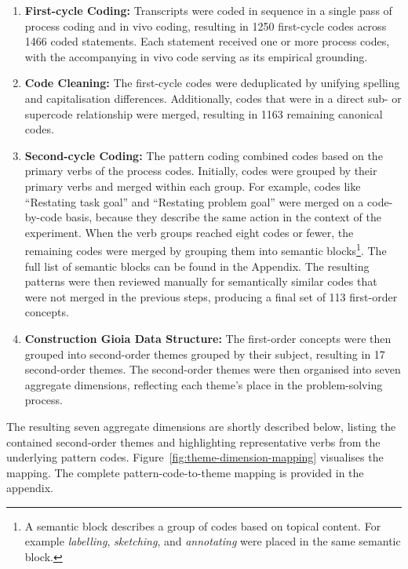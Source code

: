 \begin{enumerate}
    \item \textbf{First-cycle Coding:} Transcripts were coded in sequence in a single pass of process coding and in vivo coding, resulting in 1250 first-cycle codes across 1466 coded statements. Each statement received one or more process codes, with the accompanying in vivo code serving as its empirical grounding.

    \item \textbf{Code Cleaning:} The first-cycle codes were deduplicated by unifying spelling and capitalisation differences. Additionally, codes that were in a direct sub- or supercode relationship were merged, resulting in 1163 remaining canonical codes.

    \item \textbf{Second-cycle Coding:} The pattern coding combined codes based on the primary verbs of the process codes. Initially, codes were grouped by their primary verbs and merged within each group. For example, codes like \enquote{Restating task goal} and \enquote{Restating problem goal} were merged on a code-by-code basis, because they describe the same action in the context of the experiment.  When the verb groups reached eight codes or fewer, the remaining codes were merged by grouping them into semantic blocks\footnote{A semantic block describes a group of codes based on topical content. For example \textit{labelling}, \textit{sketching}, and \textit{annotating} were placed in the same semantic block.}. The full list of semantic blocks can be found in the Appendix. The resulting patterns were then reviewed manually for semantically similar codes that were not merged in the previous steps, producing a final set of 113 first-order concepts.

    \item \textbf{Construction Gioia Data Structure:} The first-order concepts were then grouped into second-order themes grouped by their subject, resulting in 17 second-order themes. The second-order themes were then organised into seven aggregate dimensions, reflecting each theme's place in the problem-solving process.
\end{enumerate}

The resulting seven aggregate dimensions are shortly described below, listing the contained second-order themes and highlighting representative verbs from the underlying pattern codes. Figure~\ref{fig:theme-dimension-mapping} visualises the mapping. The complete pattern-code-to-theme mapping is provided in the appendix.

